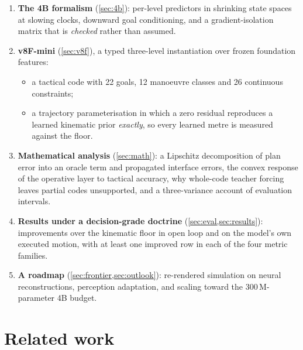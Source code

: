 \documentclass[10pt,twocolumn]{article}
\makeatletter
\theoremstyle{remark}
\renewcommand\paragraph{\@startsection{paragraph}{4}{\z@}{1.6ex \@plus .5ex \@minus .2ex}{-1em}{\normalfont\normalsize\bfseries}}
\makeatother
\begin{document}
\paragraph{Contributions.}
\begin{enumerate}[label=(\roman*)]
  \item \textbf{The 4B formalism} (\cref{sec:4b}): per-level predictors in shrinking state spaces at slowing clocks, downward goal
        conditioning, and a gradient-isolation matrix that is \emph{checked} rather than assumed.
  \item \textbf{v8F-mini} (\cref{sec:v8f}), a typed three-level instantiation over frozen foundation features:
        \begin{itemize}
          \item a tactical code with 22 goals, 12 manoeuvre classes and 26 continuous constraints;
          \item a trajectory parameterisation in which a zero residual reproduces a learned kinematic prior \emph{exactly}, so every
                learned metre is measured against the floor.
        \end{itemize}
  \item \textbf{Mathematical analysis} (\cref{sec:math}): a Lipschitz decomposition of plan error into an oracle term and propagated
        interface errors, the convex response of the operative layer to tactical accuracy, why whole-code teacher forcing leaves
        partial codes unsupported, and a three-variance account of evaluation intervals.
  \item \textbf{Results under a decision-grade doctrine} (\cref{sec:eval,sec:results}): improvements over the kinematic floor in open
        loop and on the model's own executed motion, with at least one improved row in each of the four metric families.
  \item \textbf{A roadmap} (\cref{sec:frontier,sec:outlook}): re-rendered simulation on neural reconstructions, perception adaptation,
        and scaling toward the 300\,M-parameter 4B budget.
\end{enumerate}

\section{Related work}
\end{document}
